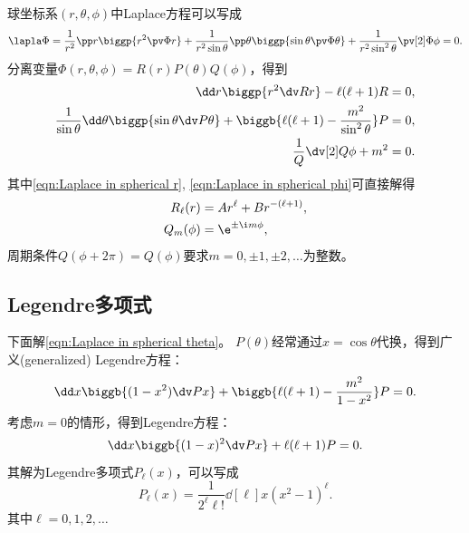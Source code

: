 球坐标系$(r,\theta,\phi)$中Laplace方程可以写成
\begin{equation}
    \label{eqn:Laplace in spherical}
    \lapla\Phi=\frac1{r^2}\pp r\biggp{r^2\pv\Phi r}+\frac1{r^2\sin\theta}\pp\theta\biggp{\sin\theta\pv\Phi\theta}+\frac1{r^2\sin^2\theta}\pv[2]\Phi\phi=0.
\end{equation}
分离变量$\Phi(r,\theta,\phi)=R(r)P(\theta)Q(\phi)$，得到 
\begin{subequations}
    \begin{align}
        \label{eqn:Laplace in spherical r}
        \dd r\biggp{r^2\dv Rr}-\ell(\ell+1)R&=0,\\
        \label{eqn:Laplace in spherical theta}
        \frac1{\sin\theta}\dd\theta\biggp{\sin\theta\dv P\theta}+\biggb{\ell(\ell+1)-\frac{m^2}{\sin^2\theta}}P&=0,\\
        \label{eqn:Laplace in spherical phi}
        \frac1Q\dv[2]Q\phi+m^2&=0.
    \end{align}
\end{subequations}
其中\eqref{eqn:Laplace in spherical r}, \eqref{eqn:Laplace in spherical phi}可直接解得
\begin{subequations}
    \begin{align}
        R_\ell(r)&=Ar^\ell+Br^{-(\ell+1)},\\
        Q_m(\phi)&=\e^{\pm\i m\phi},
    \end{align}
\end{subequations}
周期条件$Q(\phi+2\pi)=Q(\phi)$要求$m=0,\pm 1,\pm 2,\ldots$为整数。

\subsection{Legendre多项式}
\label{ssec:Legendre polynomial}

下面解\eqref{eqn:Laplace in spherical theta}。
$P(\theta)$经常通过$x=\cos\theta$代换，得到广义(generalized) Legendre方程：
\begin{equation}
    \label{eqn:general Legendre}
    \dd x\biggb{(1-x^2)\dv Px}+\biggb{\ell(\ell+1)-\frac{m^2}{1-x^2}}P=0.
\end{equation}
考虑$m=0$的情形，得到Legendre方程：
\begin{equation}
    \label{eqn:Legendre}
    \dd x\biggb{(1-x)^2\dv Px}+\ell(\ell+1)P=0.
\end{equation}
其解为Legendre多项式$P_\ell(x)$，可以写成
\begin{equation}
    \label{eqn:Rodrigues}
    P_\ell(x)=\frac1{2^\ell\ell!}\dd[\ell]x(x^2-1)^\ell.
\end{equation}
其中$\ell=0,1,2,\ldots$

